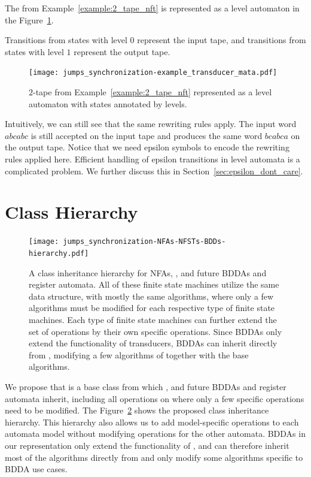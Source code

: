 \begin{example}\label{example:2_tape_nft_in_mata}
  The \nft from Example~\ref{example:2_tape_nft} is represented as a level automaton in the Figure~\ref{fig:2_tape_nft_in_mata}.

  Transitions from states with level $0$ represent the input tape, and transitions from states with level $1$ represent the output tape.

  \begin{figure}[ht]
    \centering
    \texttt{[image: jumps\_synchronization-example\_transducer\_mata.pdf]}
    \caption{
      $2$-tape \nft from Example~\ref{example:2_tape_nft} represented as a level automaton with states annotated by levels.
    }\label{fig:2_tape_nft_in_mata}
  \end{figure}

  Intuitively, we can still see that the same rewriting rules apply.
  The input word $abcabc$ is still accepted on the input tape and produces the same word $bcabca$ on the output tape.
  Notice that we need epsilon symbols to encode the rewriting rules applied here.
  Efficient handling of epsilon transitions in level automata is a complicated problem.
  We further discuss this in Section~\ref{sec:epsilon_dont_care}.

\end{example}

\section{Class Hierarchy}
\label{sec:class_hierarchy}

\begin{figure}[ht]
  \centering
  \texttt{[image: jumps\_synchronization-NFAs-NFSTs-BDDs-hierarchy.pdf]}
  \caption{
    A class inheritance hierarchy for NFAs, \nfts, and future BDDAs and register automata.
    All of these finite state machines utilize the same data structure, with mostly the same algorithms, where only a few algorithms must be modified for each respective type of finite state machines.
    Each type of finite state machines can further extend the set of operations by their own specific operations.
    Since BDDAs only extend the functionality of transducers, BDDAs can inherit directly from \nfts, modifying a few algorithms of \nfts together with the base \nfaClass algorithms.
  }
  \label{fig:class_hierarchy}
\end{figure}


We propose that \nfaClass is a base class from which \nfts, and future BDDAs and register automata inherit, including all operations on \nfaClass where only a few specific operations need to be modified.
The Figure~\ref{fig:class_hierarchy} shows the proposed class inheritance hierarchy.
This hierarchy also allows us to add model-specific operations to each automata model without modifying operations for the other automata.
BDDAs in our representation only extend the functionality of \nfts, and can therefore inherit most of the algorithms directly from \nfts and only modify some algorithms specific to BDDA use cases.

